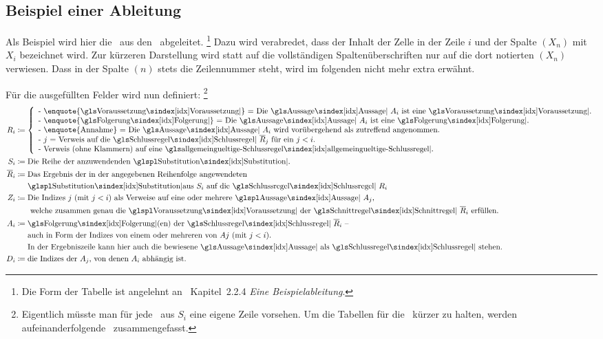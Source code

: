 {\subsection{Beispiel einer Ableitung}%
\label{sub:BeispielAbleitung}

Als Beispiel wird hier die \Schnittregel\ aus den \Basisregeln\ abgeleitet.%
\footnote{%
	Die Form der Tabelle ist angelehnt an~\cite{bib:NatuerlichesSchliessen} Kapitel~2.2.4 \emph{Eine Beispielableitung}.
}
Dazu wird verabredet, dass  der Inhalt der Zelle in der Zeile $i$ und der Spalte $(X_n)$ mit $X_i$ bezeichnet wird.
Zur kürzeren Darstellung wird statt auf die vollständigen Spaltenüberschriften nur auf die dort notierten $(X_n)$ verwiesen. Dass in der Spalte $(n)$ stets die Zeilennummer steht, wird im folgenden nicht mehr extra erwähnt.

Für die ausgefüllten Felder wird nun definiert:%
\footnote{%
	Eigentlich müsste man für jede \Substitution\ aus $S_i$ eine eigene Zeile vorsehen.
	Um die Tabellen für die \Beweise\ kürzer zu halten, werden aufeinanderfolgende \Substitutionen\ zusammengefasst.
}
\begin{align}
	R_i & \defeq
	\left\{
		\begin{array}{l}
			\text{- \enquote{\Voraussetzung} = Die \Aussage\ $A_i$ ist eine \Voraussetzung.}\\
			\text{- \enquote{\Folgerung} = Die \Aussage\ $A_i$ ist eine \Folgerung.}\\
			\text{- \enquote{Annahme} = Die \Aussage\ $A_i$ wird vorübergehend als zutreffend angenommen.}\\
			\text{- $j$ = Verweis auf die \Schlussregel\ $\overline{R}_j$ für ein $j < i$.}\\
			\text{- Verweis (ohne Klammern) auf eine \allgemeingueltigeSchlussregel.}
		\end{array}
	\right.
	\\
	S_i & \defeq \text{Die Reihe der anzuwendenden \Substitutionen.}
	\\
	\overline{R}_i & \defeq \text{Das Ergebnis der in der angegebenen Reihenfolge angewendeten}\\
	& \quad\;\; \text{\Substitutionen aus $S_i$ auf die \Schlussregel\ $R_i$}
	\\
	Z_i & \defeq \text{Die Indizes $j$ (mit $j < i$) als Verweise auf eine oder mehrere \Aussagen\ $A_j$,}\\
	& \quad\;\;\text{ welche zusammen genau die \Voraussetzungen\ der \Schnittregel\ } \overline{R}_i \text{ erfüllen.}
	\\
	A_i & \defeq \text{\Folgerung(en) der \Schlussregel\ $\overline{R}_i$ --}\\
	& \quad\;\; \text{auch in Form der Indizes von einem oder mehreren von $Aj$ (mit $j < i$).}\\
	& \quad\;\; \text{In der Ergebniszeile kann hier auch die bewiesene \Aussage\ als \Schlussregel\ stehen.}
	\\
	D_i & \defeq \text{die Indizes der $A_j$, von denen $A_i$ abhängig ist.}
\end{align}

}
